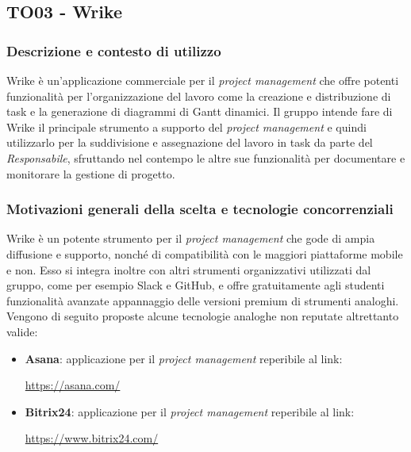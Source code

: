 \documentclass[./../Technology Baseline.tex]{subfiles}
\begin{document}
\subsection{TO03 - Wrike}

\subsubsection{Descrizione e contesto di utilizzo}
Wrike è un'applicazione commerciale per il \textit{project management} che offre potenti funzionalità per l'organizzazione del lavoro come la creazione e distribuzione di task e la generazione di diagrammi di Gantt dinamici. Il gruppo intende fare di Wrike il principale strumento a supporto del \textit{project management} e quindi utilizzarlo per la suddivisione e assegnazione del lavoro in task da parte del \textit{Responsabile}, sfruttando nel contempo le altre sue funzionalità per documentare e monitorare la gestione di progetto. 

\subsubsection{Motivazioni generali della scelta e tecnologie concorrenziali}
Wrike è un potente strumento per il \textit{project management} che gode di ampia diffusione e supporto, nonché di compatibilità con le maggiori piattaforme mobile e non. Esso si integra inoltre con altri strumenti organizzativi utilizzati dal gruppo, come per esempio Slack e GitHub, e offre gratuitamente agli studenti funzionalità avanzate appannaggio delle versioni premium di strumenti analoghi. Vengono di seguito proposte alcune tecnologie analoghe non reputate altrettanto valide:
\begin{itemize}
	\item \textbf{Asana}: applicazione per il \textit{project management} reperibile al link:
	\begin{center}
		\url{https://asana.com/}
	\end{center}
	\item \textbf{Bitrix24}: applicazione per il \textit{project management} reperibile al link:
	\begin{center}
		\url{https://www.bitrix24.com/}
	\end{center} 
\end{itemize}
\end{document}
